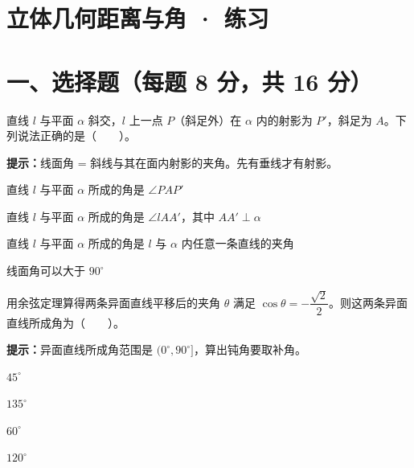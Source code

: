 \documentclass{exam-zh}
\begin{document}
\section*{立体几何距离与角 · 练习}

\section*{一、选择题（每题 8 分，共 16 分）}


\begin{question}[points=8]
  \noindent
  \begin{minipage}[t]{\dimexpr\linewidth-70mm-6mm\relax}
    \vspace{0pt}
    直线 $l$ 与平面 $\alpha$ 斜交，$l$ 上一点 $P$（斜足外）在 $\alpha$ 内的射影为 $P'$，斜足为 $A$。下列说法正确的是（　　）。
    \begin{hintbox}
\textbf{提示：}线面角 = 斜线与其在面内射影的夹角。先有垂线才有射影。\end{hintbox}

    \par
    \begin{choices}[columns=1]
      \item 直线 $l$ 与平面 $\alpha$ 所成的角是 $\angle PAP'$
      \item 直线 $l$ 与平面 $\alpha$ 所成的角是 $\angle lAA'$，其中 $AA'\perp\alpha$
      \item 直线 $l$ 与平面 $\alpha$ 所成的角是 $l$ 与 $\alpha$ 内任意一条直线的夹角
      \item 线面角可以大于 $90^\circ$
    \end{choices}
  \end{minipage}\hfill
  \begin{diagramcoltikz}{70mm}{斜线 $l$、斜足 $A$、射影 $AP'$。}
  }
  \end{diagramcoltikz}
\end{question}




\begin{question}[points=8]
  用余弦定理算得两条异面直线平移后的夹角 $\theta$ 满足 $\cos\theta=-\dfrac{\sqrt2}{2}$。则这两条异面直线所成角为（　　）。
  \begin{hintbox}
\textbf{提示：}异面直线所成角范围是 $(0^\circ,90^\circ]$，算出钝角要取补角。\end{hintbox}

  \begin{choices}
    \item $45^\circ$
    \item $135^\circ$
    \item $60^\circ$
    \item $120^\circ$
  \end{choices}
\end{question}
\end{document}
